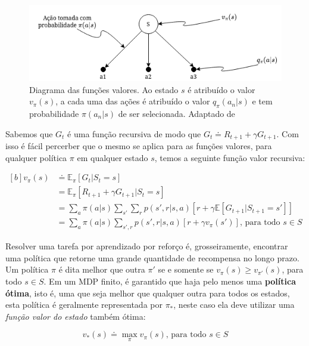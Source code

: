 \begin{figure}[h]
   \centering
   \includegraphics[scale=0.75]{figs/action-selection-diagram.drawio.png}
    \caption{Diagrama das funções valores. Ao estado $s$ é atribuído o valor $v_\pi(s)$, a cada uma das ações é atribuído o valor $q_\pi(a_n|s)$ e tem probabilidade $\pi(a_n|s)$ de ser selecionada. Adaptado de }
    \label{fig:policy-diagram}
 \end{figure}

Sabemos que $G_t$ é uma função recursiva de modo que $G_t \doteq R_{t+1} + \gamma G_{t+1}$. Com isso é fácil percerber que o mesmo se aplica para as funções valores, para qualquer política $\pi$ em qualquer estado $s$, temos a seguinte função valor recursiva:

\begin{equation}
   \begin{aligned}[b]
      v_\pi(s) &\doteq \mathbb{E}_\pi [G_t | S_t = s] \\
      &= \mathbb{E}_\pi [R_{t+1} + \gamma G_{t+1} | S_t = s] \\
      &= \sum_{a}\pi(a|s) \sum_{s'}\sum_{r}p(s', r | s, a)[r+\gamma\mathbb{E}[G_{t+1}|S_{t+1} = s']] \\
      &= \sum_{a}\pi(a|s)\sum_{s', r}p(s', r | s, a)[r + \gamma v_\pi(s')]\text{, para todo } s \in S
   \end{aligned}
   \label{recursive-state-value-function}
\end{equation}

Resolver uma tarefa por aprendizado por reforço é, grosseiramente, encontrar uma política que retorne uma grande quantidade de recompensa no longo prazo. Um política $\pi$ é dita melhor que outra $\pi'$ se e somente se $v_\pi(s) \geqslant v_{\pi'}(s)$, para todo  $s \in S$. Em um MDP finito, é garantido que haja pelo menos uma \textbf{política ótima}, isto é, uma que seja melhor que qualquer outra para todos os estados, esta política é geralmente representada por $\pi_\ast$, neste caso ela deve utilizar uma \textit{função valor do estado} também ótima:

\begin{equation} \label{state-value-optimal-function}
   v_\ast(s) \doteq \max_{\pi}v_\pi(s) \text{, para todo } s \in S
\end{equation}

